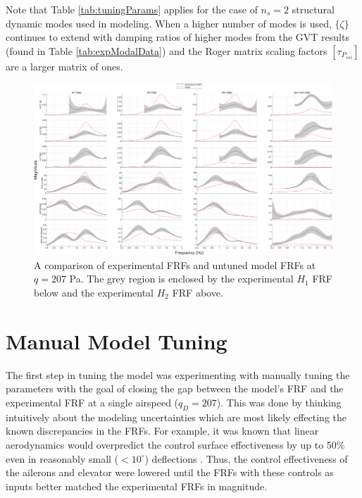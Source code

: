 Note that Table \ref{tab:tuningParams} applies for the case of $n_s=2$ structural dynamic modes used in modeling. When a higher number of modes is used, $\{\zeta\}$ continues to extend with damping ratios of higher modes from the GVT results (found in Table \ref{tab:expModalData}) and the Roger matrix scaling factors $[\tau_{P_{ssi}}]$ are a larger matrix of ones.

\begin{landscape}

\begin{figure}[H]
	\centering
	\includegraphics[width=9in]{figs/FRFcompare_noTune_q207.png}
	\caption{A comparison of experimental FRFs and untuned model FRFs at $q=207$ Pa. The grey region is enclosed by the experimental $H_1$ FRF below and the experimental $H_2$ FRF above.}
	\label{fig:noTuneFRF}
\end{figure}

\end{landscape}

\section{Manual Model Tuning} %
\label{sec:manualTuning}

The first step in tuning the model was experimenting with manually tuning the parameters with the goal of closing the gap between the model's FRF and the experimental FRF at a single airspeed ($q_D=207$). This was done by thinking intuitively about the modeling uncertainties which are most likely effecting the known discrepancies in the FRFs. For example, it was known that linear aerodynamics would overpredict the control surface effectiveness by up to 50\% even in reasonably small ($<10^\circ$) deflections \cite{Young1947,Riebe1955}. Thus, the control effectiveness of the ailerons and elevator were lowered until the FRFs with these controls as inputs better matched the experimental FRFs in magnitude.

